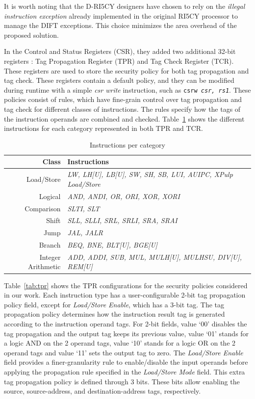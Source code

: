 It is worth noting that the D-RI5CY designers have chosen to rely on the \textit{illegal instruction exception} already implemented in the original RI5CY processor to manage the DIFT exceptions. This choice minimizes the area overhead of the proposed solution.

In the Control and Status Registers (CSR), they added two additional 32-bit registers : Tag Propagation Register (TPR) and Tag Check Register (TCR). These registers are used to store the security policy for both tag propagation and tag check. These registers contain a default policy, and they can be modified during runtime with a simple \textit{csr write} instruction, such as \texttt{csrw \textit{csr, rs1}}.
These policies consist of rules, which have fine-grain control over tag propagation and tag check for different classes of instructions. The rules specify how the tags of the instruction operands are combined and checked.
Table~\ref{tab:insnClasses} shows the different instructions for each category represented in both TPR and TCR.

\begin{table}[t]
    \centering
    \footnotesize
    \caption{Instructions per category}
    \label{tab:insnClasses}
    \begin{tabular}{@{}rl@{}}
        \toprule
        \textbf{Class} & \textbf{Instructions} \\ \midrule
        Load/Store & \textit{LW, LH{[}U{]}, LB{[}U{]}, SW, SH, SB, LUI, AUIPC, XPulp Load/Store} \\
        Logical & \textit{AND, ANDI, OR, ORI, XOR, XORI} \\
        Comparison & \textit{SLTI, SLT} \\
        Shift & \textit{SLL, SLLI, SRL, SRLI, SRA, SRAI} \\
        Jump & \textit{JAL, JALR} \\
        Branch & \textit{BEQ, BNE, BLT{[}U{]}, BGE{[}U{]}} \\
        Integer Arithmetic & \textit{ADD, ADDI, SUB, MUL, MULH{[}U{]}, MULHSU, DIV{[}U{]}, REM{[}U{]}} \\ \bottomrule
    \end{tabular}
\end{table}


Table~\ref{tab:tpr} shows the TPR configurations for the security policies considered in our work.
Each instruction type has a user-configurable 2-bit tag propagation policy field, except for \textit{Load/Store Enable}, which has a 3-bit tag.
The tag propagation policy determines how the instruction result tag is generated according to the instruction operand tags.
For 2-bit fields, value `00' disables the tag propagation and the output tag keeps its previous value, value `01' stands for a logic AND on the 2 operand tags, value `10' stands for a logic OR on the 2 operand tags and value `11' sets the output tag to zero. 
The \textit{Load/Store Enable} field provides a finer-granularity rule to enable/disable the input operands before applying the propagation rule specified in the \textit{Load/Store Mode} field. This extra tag propagation policy is defined through 3 bits. These bits allow enabling the source, source-address, and destination-address tags, respectively.


